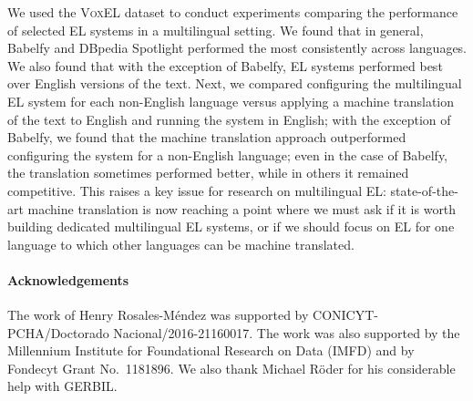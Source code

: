 \documentclass{llncs}
\begin{document}
We used the \textsc{VoxEL} dataset to conduct experiments comparing the performance of selected EL systems in a multilingual setting. We found that in general, Babelfy and DBpedia Spotlight performed the most consistently across languages. We also found that with the exception of Babelfy, EL systems performed best over English versions of the text. Next, we compared configuring the multilingual EL system for each non-English language versus applying a machine translation of the text to English and running the system in English; with the exception of Babelfy, we found that the machine translation approach outperformed configuring the system for a non-English language; even in the case of Babelfy, the translation sometimes performed better, while in others it remained competitive. This raises a key issue for research on multilingual EL: state-of-the-art machine translation is now reaching a point where we must ask if it is worth building dedicated multilingual EL systems, or if we should focus on EL for one language to which other languages can be machine translated. 


{\footnotesize
\paragraph{Acknowledgements} The work of Henry Rosales-M\'endez was supported by CONICYT-PCHA/Doctorado Nacional/2016-21160017. The work was also supported by the Millennium Institute for Foundational Research on Data (IMFD) and by Fondecyt Grant No.\ 1181896. We also thank Michael R\"oder for his considerable help with GERBIL.}

%
%
%



\end{document}
